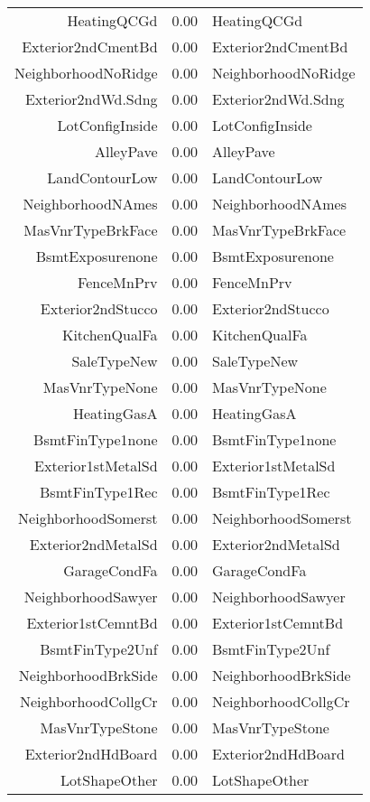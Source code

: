 \begin{table}[ht]
\begin{tabular}{rrl}
  HeatingQCGd & 0.00 & HeatingQCGd \\ 
  Exterior2ndCmentBd & 0.00 & Exterior2ndCmentBd \\ 
  NeighborhoodNoRidge & 0.00 & NeighborhoodNoRidge \\ 
  Exterior2ndWd.Sdng & 0.00 & Exterior2ndWd.Sdng \\ 
  LotConfigInside & 0.00 & LotConfigInside \\ 
  AlleyPave & 0.00 & AlleyPave \\ 
  LandContourLow & 0.00 & LandContourLow \\ 
  NeighborhoodNAmes & 0.00 & NeighborhoodNAmes \\ 
  MasVnrTypeBrkFace & 0.00 & MasVnrTypeBrkFace \\ 
  BsmtExposurenone & 0.00 & BsmtExposurenone \\ 
  FenceMnPrv & 0.00 & FenceMnPrv \\ 
  Exterior2ndStucco & 0.00 & Exterior2ndStucco \\ 
  KitchenQualFa & 0.00 & KitchenQualFa \\ 
  SaleTypeNew & 0.00 & SaleTypeNew \\ 
  MasVnrTypeNone & 0.00 & MasVnrTypeNone \\ 
  HeatingGasA & 0.00 & HeatingGasA \\ 
  BsmtFinType1none & 0.00 & BsmtFinType1none \\ 
  Exterior1stMetalSd & 0.00 & Exterior1stMetalSd \\ 
  BsmtFinType1Rec & 0.00 & BsmtFinType1Rec \\ 
  NeighborhoodSomerst & 0.00 & NeighborhoodSomerst \\ 
  Exterior2ndMetalSd & 0.00 & Exterior2ndMetalSd \\ 
  GarageCondFa & 0.00 & GarageCondFa \\ 
  NeighborhoodSawyer & 0.00 & NeighborhoodSawyer \\ 
  Exterior1stCemntBd & 0.00 & Exterior1stCemntBd \\ 
  BsmtFinType2Unf & 0.00 & BsmtFinType2Unf \\ 
  NeighborhoodBrkSide & 0.00 & NeighborhoodBrkSide \\ 
  NeighborhoodCollgCr & 0.00 & NeighborhoodCollgCr \\ 
  MasVnrTypeStone & 0.00 & MasVnrTypeStone \\ 
  Exterior2ndHdBoard & 0.00 & Exterior2ndHdBoard \\ 
  LotShapeOther & 0.00 & LotShapeOther \\ 

\end{tabular}
\end{table}
